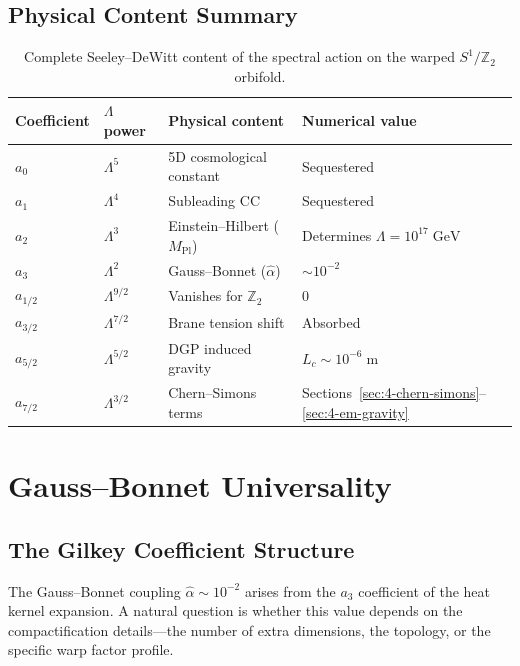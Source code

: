 \subsection{Physical Content Summary}
\label{sec:4-physical-summary}

\begin{table}[htbp]
\centering
\caption{Complete Seeley--DeWitt content of the spectral action on the warped $S^1/\mathbb{Z}_2$ orbifold.}
\label{tab:4-1}
\begin{tabular}{@{}llll@{}}
\toprule
Coefficient & $\Lambda$ power & Physical content & Numerical value \\
\midrule
$a_0$       & $\Lambda^5$     & 5D cosmological constant       & Sequestered \\
$a_1$       & $\Lambda^4$     & Subleading CC                  & Sequestered \\
$a_2$       & $\Lambda^3$     & Einstein--Hilbert ($M_{\mathrm{Pl}}$)  & Determines $\Lambda = 10^{17}\;\mathrm{GeV}$ \\
$a_3$       & $\Lambda^2$     & Gauss--Bonnet ($\hat\alpha$)    & $\sim 10^{-2}$ \\
$a_{1/2}$   & $\Lambda^{9/2}$ & Vanishes for $\mathbb{Z}_2$    & 0 \\
$a_{3/2}$   & $\Lambda^{7/2}$ & Brane tension shift            & Absorbed \\
$a_{5/2}$   & $\Lambda^{5/2}$ & DGP induced gravity            & $L_c \sim 10^{-6}\;\mathrm{m}$ \\
$a_{7/2}$   & $\Lambda^{3/2}$ & Chern--Simons terms            & Sections~\ref{sec:4-chern-simons}--\ref{sec:4-em-gravity} \\
\bottomrule
\end{tabular}
\end{table}


\section{Gauss--Bonnet Universality}
\label{sec:4-gb-universality}

\subsection{The Gilkey Coefficient Structure}
\label{sec:4-gilkey}

The Gauss--Bonnet coupling $\hat{\alpha} \sim 10^{-2}$ arises from the $a_3$ coefficient of the heat kernel expansion. A natural question is whether this value depends on the compactification details---the number of extra dimensions, the topology, or the specific warp factor profile.

